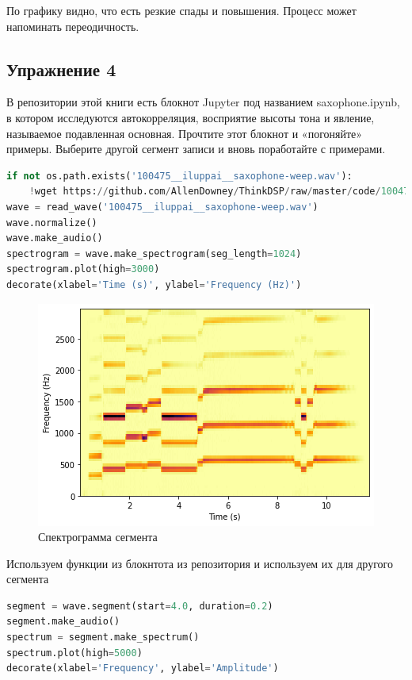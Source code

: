 По графику видно, что есть резкие спады и повышения. Процесс может напоминать переодичность.

\subsection{Упражнение 4}

В репозитории этой книги есть блокнот Jupyter под названием saxophone.ipynb, в котором исследуются автокорреляция, восприятие высоты тона и явление, называемое подавленная основная. Прочтите этот блокнот и «погоняйте» примеры. Выберите другой сегмент записи и вновь поработайте с примерами.

\begin{lstlisting}[language=Python]
if not os.path.exists('100475__iluppai__saxophone-weep.wav'):
    !wget https://github.com/AllenDowney/ThinkDSP/raw/master/code/100475__iluppai__saxophone-weep.wav
wave = read_wave('100475__iluppai__saxophone-weep.wav')
wave.normalize()
wave.make_audio()
spectrogram = wave.make_spectrogram(seg_length=1024)
spectrogram.plot(high=3000)
decorate(xlabel='Time (s)', ylabel='Frequency (Hz)')
\end{lstlisting}
\begin{figure}[H]
	\begin{center}
		\includegraphics[scale=1]{fig/lab05/lab05_7.png}
		\caption{Спектрограмма сегмента}
	\end{center}
\end{figure}

Используем функции из блокнтота из репозитория и используем их для другого сегмента

\begin{lstlisting}[language=Python]
segment = wave.segment(start=4.0, duration=0.2)
segment.make_audio()
spectrum = segment.make_spectrum()
spectrum.plot(high=5000)
decorate(xlabel='Frequency', ylabel='Amplitude')
\end{lstlisting}

